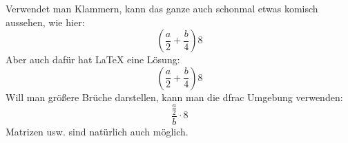\documentclass[a4paper]{scrartcl}
\begin{document}
Verwendet man Klammern, kann das ganze auch schonmal etwas komisch aussehen, wie hier:
\begin{equation*}
    (\frac{a}{2} + \frac{b}{4})8
\end{equation*}
Aber auch dafür hat \LaTeX{} eine Lösung:
\begin{equation*}
    \left(\frac{a}{2} + \frac{b}{4}\right)8
\end{equation*}
Will man größere Brüche darstellen, kann man die dfrac Umgebung verwenden:
\begin{equation*}
    \dfrac{ \frac{a}{2} }{ b } \cdot 8
\end{equation*}
Matrizen usw. sind natürlich auch möglich.
\end{document}
